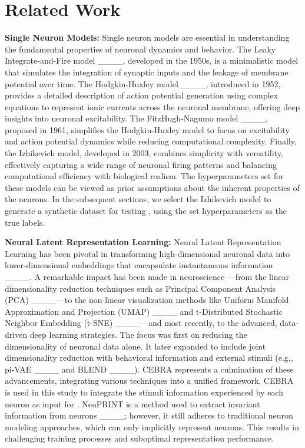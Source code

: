 \section{Related Work}
\textbf{Single Neuron Models:} Single neuron models are essential in understanding the fundamental properties of neuronal dynamics and behavior. The Leaky Integrate-and-Fire model ____, developed in the 1950s, is a minimalistic model that simulates the integration of synaptic inputs and the leakage of membrane potential over time. The Hodgkin-Huxley model ____, introduced in 1952, provides a detailed description of action potential generation using complex equations to represent ionic currents across the neuronal membrane, offering deep insights into neuronal excitability. The FitzHugh-Nagumo model ____, proposed in 1961, simplifies the Hodgkin-Huxley model to focus on excitability and action potential dynamics while reducing computational complexity. Finally, the Izhikevich model, developed in 2003, combines simplicity with versatility, effectively capturing a wide range of neuronal firing patterns and balancing computational efficiency with biological realism. The hyperparameters set for these models can be viewed as prior assumptions about the inherent properties of the neurons. In the subsequent sections, we select the Izhikevich model to generate a synthetic dataset for testing , using the set hyperparameters as the true labels. 

\textbf{Neural Latent Representation Learning:} Neural Latent Representation Learning has been pivotal in transforming high-dimensional neuronal data into lower-dimensional embeddings that encapsulate instantaneous information ____. A remarkable impact has been made in neuroscience —from the linear dimensionality reduction techniques such as Principal Component Analysis (PCA) ____—to the non-linear visualization methods like Uniform Manifold Approximation and Projection (UMAP) ____ and t-Distributed Stochastic Neighbor Embedding (t-SNE) ____—and most recently, to the advanced, data-driven deep learning strategies. The focus was first on reducing the dimensionality of neuronal data alone. It later expanded to include joint dimensionality reduction with behavioral information and external stimuli (e.g., pi-VAE ____ and BLEND ____). CEBRA represents a culmination of these advancements, integrating various techniques into a unified framework. CEBRA is used in this study to integrate the stimuli information experienced by each neuron as input for . NeuPRINT is a method used to extract invariant information from neurons ____; however, it still adheres to traditional neuron modeling approaches, which can only implicitly represent neurons. This results in challenging training processes and suboptimal representation performance.

